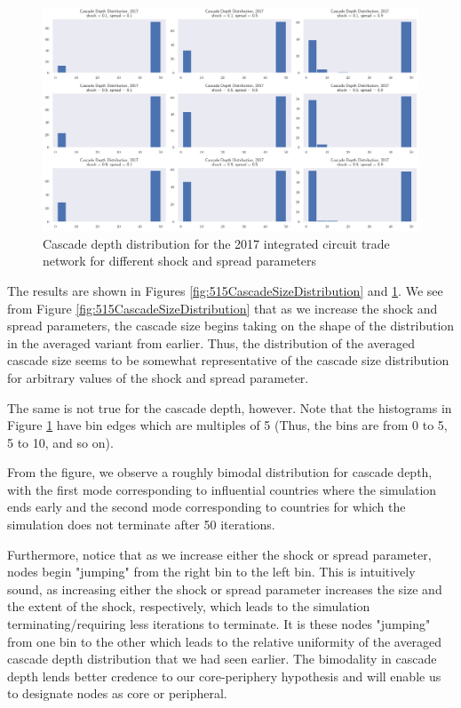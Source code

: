 \documentclass[12pt,letterpaper]{report}
\begin{document}
				\begin{figure}[!h]
					\centering
					\includegraphics[width=\textwidth]{Fig516-CascadeDepthDistribution.png}
					\caption{Cascade depth distribution for the 2017 integrated circuit trade network for different shock and spread parameters}\label{fig:516CascadeDepthDistribution}
				\end{figure}
				
				The results are shown in Figures \ref{fig:515CascadeSizeDistribution} and \ref{fig:516CascadeDepthDistribution}. We see from Figure \ref{fig:515CascadeSizeDistribution} that as we increase the shock and spread parameters, the cascade size begins taking on the shape of the distribution in the averaged variant from earlier. Thus, the distribution of the averaged cascade size seems to be somewhat representative of the cascade size distribution for arbitrary values of the shock and spread parameter.
				
				The same is not true for the cascade depth, however. Note that the histograms in Figure \ref{fig:516CascadeDepthDistribution} have bin edges which are multiples of 5 (Thus, the bins are from 0 to 5, 5 to 10, and so on).
				
				From the figure, we observe a roughly bimodal distribution for cascade depth, with the first mode corresponding to influential countries where the simulation ends early and the second mode corresponding to countries for which the simulation does not terminate after 50 iterations.
				
				Furthermore, notice that as we increase either the shock or spread parameter, nodes begin "jumping" from the right bin to the left bin. This is intuitively sound, as increasing either the shock or spread parameter increases the size and the extent of the shock, respectively, which leads to the simulation terminating/requiring less iterations to terminate. It is these nodes "jumping" from one bin to the other which leads to the relative uniformity of the averaged cascade depth distribution that we had seen earlier. The bimodality in cascade depth lends better credence to our core-periphery hypothesis and will enable us to designate nodes as core or peripheral.
				
\end{document}
